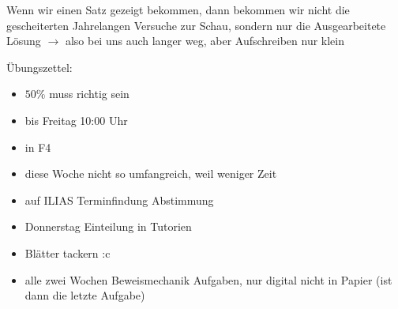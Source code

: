 \documentclass[consecutivenumbering]{gadsescript}
\begin{document}
Wenn wir einen Satz gezeigt bekommen, dann bekommen wir nicht die gescheiterten Jahrelangen Versuche zur Schau, sondern nur die Ausgearbeitete Lösung $\rightarrow$ also bei uns auch langer weg, aber Aufschreiben nur klein

Übungszettel:
\begin{itemize}
	\item $ 50\% $ muss richtig sein
	\item bis Freitag 10:00 Uhr
	\item in F4
	\item diese Woche nicht so umfangreich, weil weniger Zeit
	\item auf ILIAS Terminfindung Abstimmung
	\item Donnerstag Einteilung in Tutorien
	\item Blätter tackern :c
	\item alle zwei Wochen Beweismechanik Aufgaben, nur digital nicht in Papier (ist dann die letzte Aufgabe)
\end{itemize}
\end{document}
